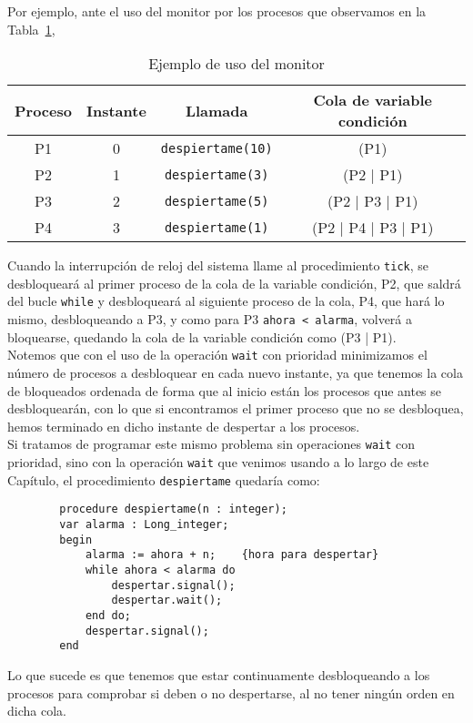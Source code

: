 \begin{ejemplo}
    Por ejemplo, ante el uso del monitor por los procesos que observamos en la Tabla~\ref{tab:ejm_uso_monitor},
    \begin{table}
    \centering
    \begin{tabular}{|c|c|c|c|}
        \hline
        Proceso & Instante & Llamada & Cola de variable condición \\
        \hline
        P1 & 0 & \verb|despiertame(10)| & (P1) \\
        \hline
        P2 & 1 & \verb|despiertame(3)| & (P2 | P1) \\
        \hline
        P3 & 2 & \verb|despiertame(5)| & (P2 | P3 | P1) \\
        \hline
        P4 & 3 & \verb|despiertame(1)| & (P2 | P4 | P3 | P1) \\
        \hline
    \end{tabular}
    \caption{Ejemplo de uso del monitor}
    \label{tab:ejm_uso_monitor}
    \end{table}
    Cuando la interrupción de reloj del sistema llame al procedimiento \verb|tick|, se desbloqueará al primer proceso de la cola de la variable condición, P2, que saldrá del bucle \verb|while| y desbloqueará al siguiente proceso de la cola, P4, que hará lo mismo, desbloqueando a P3, y como para P3 \verb|ahora < alarma|, volverá a bloquearse, quedando la cola de la variable condición como (P3 | P1).\\

    Notemos que con el uso de la operación \verb|wait| con prioridad minimizamos el número de procesos a desbloquear en cada nuevo instante, ya que tenemos la cola de bloqueados ordenada de forma que al inicio están los procesos que antes se desbloquearán, con lo que si encontramos el primer proceso que no se desbloquea, hemos terminado en dicho instante de despertar a los procesos.\\

    Si tratamos de programar este mismo problema sin operaciones \verb|wait| con prioridad, sino con la operación \verb|wait| que venimos usando a lo largo de este Capítulo, el procedimiento \verb|despiertame| quedaría como:
    \begin{verbatim}
        procedure despiertame(n : integer);
        var alarma : Long_integer;
        begin
            alarma := ahora + n;    {hora para despertar}
            while ahora < alarma do 
                despertar.signal();
                despertar.wait();
            end do;
            despertar.signal();
        end
    \end{verbatim}
    Lo que sucede es que tenemos que estar continuamente desbloqueando a los procesos para comprobar si deben o no despertarse, al no tener ningún orden en dicha cola.
\end{ejemplo}

